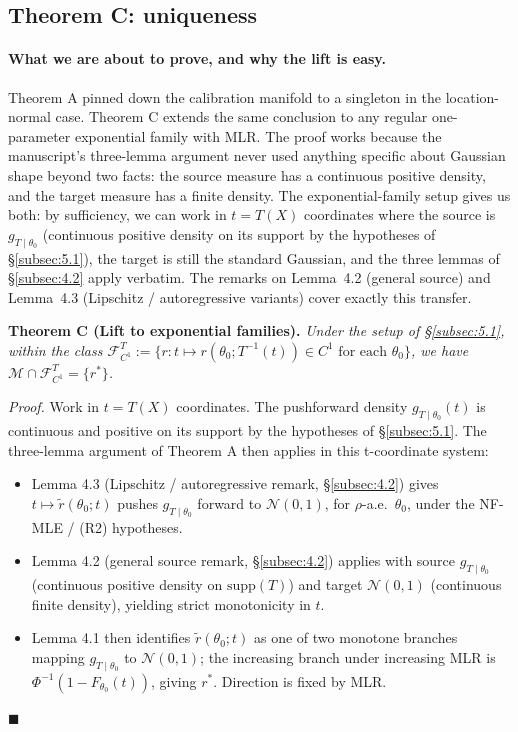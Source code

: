 \documentclass[11pt]{article}
\providecommand{\tightlist}{\setlength{\itemsep}{0pt}\setlength{\parskip}{0pt}}
\begin{document}
\subsection{Theorem C: uniqueness}\label{subsec:5.2}

\paragraph{What we are about to prove, and why the lift is easy.}
Theorem A pinned down the calibration manifold to a singleton in the
location-normal case. Theorem C extends the same conclusion to any
regular one-parameter exponential family with MLR. The proof works
because the manuscript's three-lemma argument never used anything
specific about Gaussian shape beyond two facts: the source measure has
a continuous positive density, and the target measure has a finite
density. The exponential-family setup gives us both: by sufficiency, we
can work in \(t = T(X)\) coordinates where the source is
\(g_{T \mid \theta_0}\) (continuous positive density on its support by
the hypotheses of \S\ref{subsec:5.1}), the target is still the
standard Gaussian, and the three lemmas of \S\ref{subsec:4.2} apply
verbatim. The remarks on Lemma~4.2 (general source) and Lemma~4.3
(Lipschitz / autoregressive variants) cover exactly this transfer.

\textbf{Theorem C (Lift to exponential families).} \emph{Under the setup
of \S\ref{subsec:5.1}, within the class
\(\mathcal{F}^T_{C^1} := \{r : t \mapsto r(\theta_0; T^{-1}(t)) \in C^1 \text{ for each } \theta_0\}\),
we have \(\mathcal{M} \cap \mathcal{F}^T_{C^1} = \{r^*\}\).}

\emph{Proof.} Work in \(t = T(X)\) coordinates. The pushforward density
\(g_{T \mid \theta_0}(t)\) is continuous and positive on its support
by the hypotheses of \S\ref{subsec:5.1}. The three-lemma argument of
Theorem A then applies in this t-coordinate system:
\begin{itemize}
\tightlist
\item Lemma 4.3 (Lipschitz / autoregressive remark, \S\ref{subsec:4.2})
  gives \(t \mapsto \tilde r(\theta_0; t)\) pushes
  \(g_{T \mid \theta_0}\) forward to \(\mathcal{N}(0,1)\), for
  \(\rho\)-a.e.\ \(\theta_0\), under the NF-MLE / (R2) hypotheses.
\item Lemma 4.2 (general source remark, \S\ref{subsec:4.2}) applies with
  source \(g_{T \mid \theta_0}\) (continuous positive density on
  \(\mathrm{supp}(T)\)) and target \(\mathcal{N}(0,1)\) (continuous
  finite density), yielding strict monotonicity in \(t\).
\item Lemma 4.1 then identifies \(\tilde r(\theta_0; t)\) as one of two
  monotone branches mapping \(g_{T \mid \theta_0}\) to
  \(\mathcal{N}(0,1)\); the increasing branch under increasing MLR is
  \(\Phi^{-1}(1 - F_{\theta_0}(t))\), giving \(r^*\). Direction is fixed
  by MLR.
\end{itemize}
\(\blacksquare\)
\end{document}
